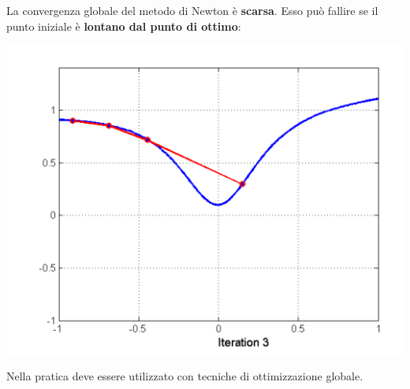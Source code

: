 \documentclass[12pt]{article}
\begin{document}
La convergenza globale del metodo di Newton è \textbf{scarsa}. Esso può fallire se il punto iniziale è \textbf{lontano dal punto di ottimo}:
\begin{center}
    \includegraphics[width =0.55\linewidth]{Images/99.PNG}
\end{center}
Nella pratica deve essere utilizzato con tecniche di ottimizzazione globale.
\end{document}
